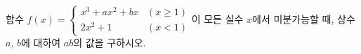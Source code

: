 함수 $f(x)=\begin{cases} x^3+ax^2+bx & (x\ge 1) \\ 2x^2+1 & (x<1) \end{cases}$이 모든 실수 $x$에서 미분가능할 때, 상수 $a$, $b$에 대하여 $ab$의 값을 구하시오.
